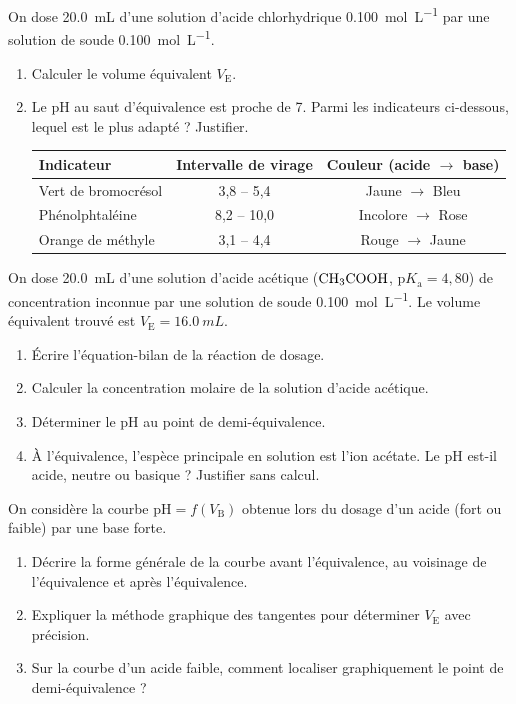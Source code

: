 \documentclass[11pt]{article}
\begin{document}
\begin{exercice}
On dose \SI{20,0}{mL} d'une solution d'acide chlorhydrique \SI{0,100}{mol.L^{-1}} par une solution de soude \SI{0,100}{mol.L^{-1}}.
\begin{enumerate}
    \item Calculer le volume équivalent $V_\mathrm{E}$.
    \item Le pH au saut d'équivalence est proche de 7. Parmi les indicateurs ci-dessous, lequel est le plus adapté ? Justifier.
    \begin{tabular}{lcc}
        \toprule
        Indicateur & Intervalle de virage & Couleur (acide $\to$ base) \\
        \midrule
        Vert de bromocrésol & 3,8 -- 5,4 & Jaune $\to$ Bleu \\
        Phénolphtaléine & 8,2 -- 10,0 & Incolore $\to$ Rose \\
        Orange de méthyle & 3,1 -- 4,4 & Rouge $\to$ Jaune \\
        \bottomrule
    \end{tabular}
\end{enumerate}
\end{exercice}

\begin{exercice}
On dose \SI{20,0}{mL} d'une solution d'acide acétique ($\ce{CH3COOH}$, $\mathrm{p}K_\mathrm{a} = 4,80$) de concentration inconnue par une solution de soude \SI{0,100}{mol.L^{-1}}. Le volume équivalent trouvé est $V_\mathrm{E} = \SI{16,0}{mL}$.
\begin{enumerate}
    \item Écrire l'équation-bilan de la réaction de dosage.
    \item Calculer la concentration molaire de la solution d'acide acétique.
    \item Déterminer le pH au point de demi-équivalence.
    \item À l'équivalence, l'espèce principale en solution est l'ion acétate. Le pH est-il acide, neutre ou basique ? Justifier sans calcul.
\end{enumerate}
\end{exercice}

\begin{exercice}
On considère la courbe $\mathrm{pH} = f(V_\mathrm{B})$ obtenue lors du dosage d'un acide (fort ou faible) par une base forte.
\begin{enumerate}
    \item Décrire la forme générale de la courbe avant l'équivalence, au voisinage de l'équivalence et après l'équivalence.
    \item Expliquer la méthode graphique des tangentes pour déterminer $V_\mathrm{E}$ avec précision.
    \item Sur la courbe d'un acide faible, comment localiser graphiquement le point de demi-équivalence ?
\end{enumerate}
\end{exercice}
\end{document}
